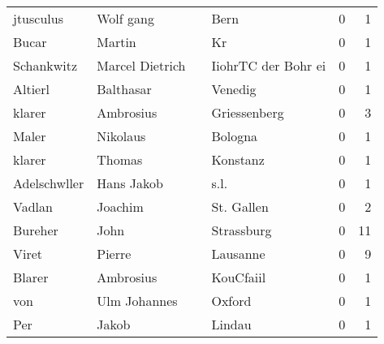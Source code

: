 \begin{center}
\begin{tiny}
\begin{longtabu}{llllrr}
                jtusculus &                          Wolf gang &             &                                        Bern &          0 &         1 \\
                    Bucar &                             Martin &             &                                          Kr &          0 &         1 \\
               Schankwitz &                    Marcel Dietrich &             &                         IiohrTC der Bohr ei &          0 &         1 \\
                  Altierl &                          Balthasar &             &                                     Venedig &          0 &         1 \\
                   klarer &                          Ambrosius &             &                                Griessenberg &          0 &         3 \\
                    Maler &                           Nikolaus &             &                                     Bologna &          0 &         1 \\
                   klarer &                             Thomas &             &                                    Konstanz &          0 &         1 \\
             Adelschwller &                         Hans Jakob &             &                                        s.l. &          0 &         1 \\
                   Vadlan &                            Joachim &             &                                  St. Gallen &          0 &         2 \\
                  Bureher &                               John &             &                                  Strassburg &          0 &        11 \\
                    Viret &                             Pierre &             &                                    Lausanne &          0 &         9 \\
                   Blarer &                          Ambrosius &             &                                   KouCfaiil &          0 &         1 \\
                      von &                       Ulm Johannes &             &                                      Oxford &          0 &         1 \\
                      Per &                              Jakob &             &                                      Lindau &          0 &         1 \\

\end{longtabu}
\end{tiny}
\end{center}
